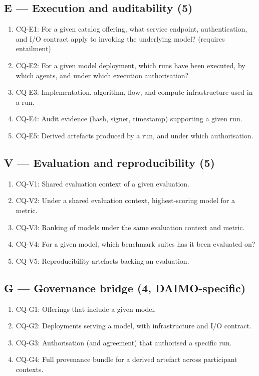 \documentclass[Afour,sagev,times]{sagej}
\newcommand{\cq}[1]{\textsf{#1}}
\begin{document}
\subsection*{E --- Execution and auditability (5)}
\begin{enumerate}[label=\arabic*., leftmargin=*]
\item \cq{CQ-E1}: For a given catalog offering, what service endpoint, authentication, and I/O contract apply to invoking the underlying model? (requires entailment)
\item \cq{CQ-E2}: For a given model deployment, which runs have been executed, by which agents, and under which execution authorisation?
\item \cq{CQ-E3}: Implementation, algorithm, flow, and compute infrastructure used in a run.
\item \cq{CQ-E4}: Audit evidence (hash, signer, timestamp) supporting a given run.
\item \cq{CQ-E5}: Derived artefacts produced by a run, and under which authorisation.
\end{enumerate}

\subsection*{V --- Evaluation and reproducibility (5)}
\begin{enumerate}[label=\arabic*., leftmargin=*]
\item \cq{CQ-V1}: Shared evaluation context of a given evaluation.
\item \cq{CQ-V2}: Under a shared evaluation context, highest-scoring model for a metric.
\item \cq{CQ-V3}: Ranking of models under the same evaluation context and metric.
\item \cq{CQ-V4}: For a given model, which benchmark suites has it been evaluated on?
\item \cq{CQ-V5}: Reproducibility artefacts backing an evaluation.
\end{enumerate}

\subsection*{G --- Governance bridge (4, DAIMO-specific)}
\begin{enumerate}[label=\arabic*., leftmargin=*]
\item \cq{CQ-G1}: Offerings that include a given model.
\item \cq{CQ-G2}: Deployments serving a model, with infrastructure and I/O contract.
\item \cq{CQ-G3}: Authorisation (and agreement) that authorised a specific run.
\item \cq{CQ-G4}: Full provenance bundle for a derived artefact across participant contexts.
\end{enumerate}
\end{document}

